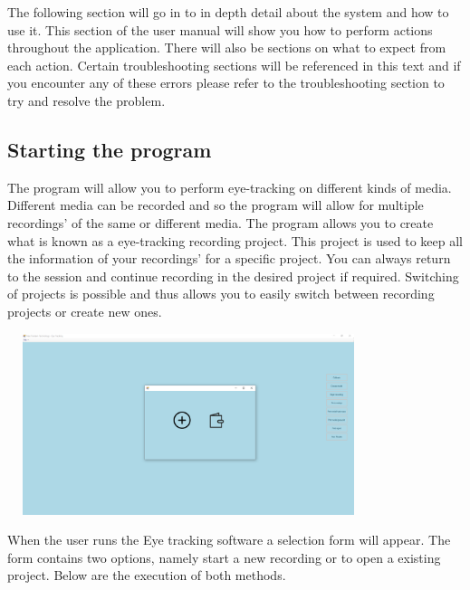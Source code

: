 The following section will go in to in depth detail about the system and how to use it. This section of the user manual will show you how to perform actions throughout the application. There will also be sections on what to expect from each action. Certain troubleshooting sections will be referenced in this text and if you encounter any of these errors please refer to the troubleshooting section to try and resolve the problem.

\subsection{Starting the program}
The program will allow you to perform eye-tracking on different kinds of media. Different media can be recorded and so the program will allow for multiple recordings' of the same or different media. The program allows you to create what is known as a eye-tracking recording project. This project is used to keep all the information of your recordings' for a specific project. You can always return to the session and continue recording in the desired project if required. Switching of projects is possible and thus allows you to easily switch between recording projects or create new ones.\newline

\includegraphics[width=400px,height=200px]{./Images/StartupPage.PNG}

When the user runs the Eye tracking software a selection form will appear. The form contains two options, namely start a new recording or to open a existing project. Below are the execution of both methods.

